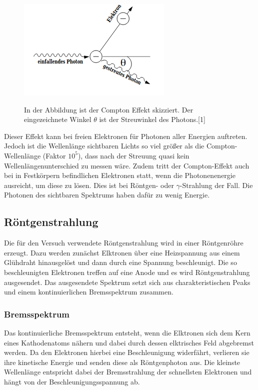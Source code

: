\documentclass[titlepage = firstcover]{scrartcl}
\begin{document}
        \FloatBarrier
        \begin{figure}[h]
            \centering
            \caption{In der Abbildung ist der Compton Effekt skizziert. Der eingezeichnete Winkel $\theta$ ist der Streuwinkel des Photons.[1]}
            \includegraphics{SkizzeCompton.png}
            \label{fig:SkizzeCompton}
        \end{figure}
        \FloatBarrier
        \noindent

        Dieser Effekt kann bei freien Elektronen für Photonen aller Energien auftreten. Jedoch ist die Wellenlänge sichtbaren Lichts so viel größer
        als die Compton-Wellenlänge (Faktor $10^5$), dass nach der Streuung quasi kein Wellenlängenunterschied zu messen wäre. Zudem tritt der Compton-Effekt
        auch bei in Festkörpern befindlichen Elektronen statt, wenn die Photonenenergie ausreicht, um diese zu lösen. Dies ist bei Röntgen- oder $\gamma$-Strahlung
        der Fall. Die Photonen des sichtbaren Spektrums haben dafür zu wenig Energie.

        \subsection{Röntgenstrahlung}
        Die für den Versuch verwendete Röntgenstrahlung wird in einer Röntgenröhre erzeugt. Dazu werden zunächst Elktronen über eine Heizspannung aus einem
        Glühdraht hinausgelöst und dann durch eine Spannung beschleunigt. Die so beschleunigten Elektronen treffen auf eine Anode und es wird Röntgenstrahlung
        ausgesendet. Das ausgesendete Spektrum setzt sich aus charakteristischen Peaks und einem kontinuierlichen Bremsspektrum zusammen. 
        
            \subsubsection*{Bremsspektrum}
                Das kontinuierliche Bremsspektrum entsteht, wenn die Elktronen sich dem Kern eines Kathodenatoms nähern und dabei durch dessen elktrisches 
                Feld abgebremst werden. Da den Elektronen hierbei eine Beschleunigung widerfährt, verlieren sie ihre kinetische Energie und senden diese als 
                Röntgenphoton aus. Die kleinste Wellenlänge entspricht dabei der Bremsstrahlung der schnellsten Elektronen und hängt von der 
                Beschleunigungsspannung ab.
                
\end{document}
